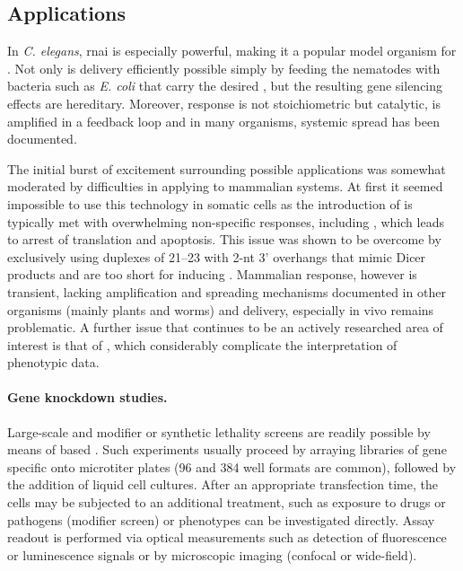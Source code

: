 \subsection{Applications}
In \textit{C. elegans}, \acrlong{rnai} is especially powerful, making it a popular model organism for . Not only is delivery efficiently possible simply by feeding the nematodes with bacteria such as \textit{E. coli} that carry the desired , but the resulting gene silencing effects are hereditary. Moreover,  response is not stoichiometric but catalytic, is amplified in a feedback loop and in many organisms, systemic spread has been documented.

The initial burst of excitement surrounding possible applications was somewhat moderated by difficulties in applying  to mammalian systems. At first it seemed impossible to use this technology in somatic cells as the introduction of  is typically met with overwhelming non-specific responses, including  , which leads to arrest of translation and apoptosis. This issue was shown to be overcome by exclusively using  duplexes of 21--\SI{23}{\nucleotide} with 2-nt 3' overhangs that mimic Dicer products and are too short for inducing . Mammalian  response, however is transient, lacking amplification and spreading mechanisms documented in other organisms (mainly plants and worms) and delivery, especially in vivo remains problematic. A further issue that continues to be an actively researched area of interest is that of , which considerably complicate the interpretation of phenotypic data.

\paragraph{Gene knockdown studies.}
Large-scale  and modifier or synthetic lethality screens are readily possible by means of  based . Such experiments usually proceed by arraying libraries of gene specific  onto microtiter plates (96 and 384 well formats are common), followed by the addition of liquid cell cultures. After an appropriate transfection time, the cells may be subjected to an additional treatment, such as exposure to drugs or pathogens (modifier screen) or  phenotypes can be investigated directly. Assay readout is performed via optical measurements such as detection of fluorescence or luminescence signals or by microscopic imaging (confocal or wide-field).

